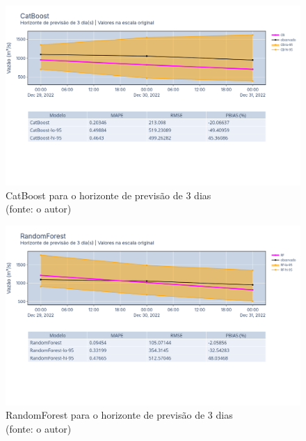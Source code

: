 \begin{figure}[!h]
	\centering
	\includegraphics[scale=0.33]{Figuras/jequiti/resultados/CatBoost_fh3.png}
	\caption{CatBoost para o horizonte de previsão de 3 dias\\(fonte: o autor)}
	\label{fig:jequiti_CatBoostRegressor_fh3}
\end{figure}

\begin{figure}[!h]
	\centering
	\includegraphics[scale=0.33]{Figuras/jequiti/resultados/RandomForest_fh3.png}
	\caption{RandomForest para o horizonte de previsão de 3 dias\\(fonte: o autor)}
	\label{fig:jequiti_RandomForest_fh3}
\end{figure}

